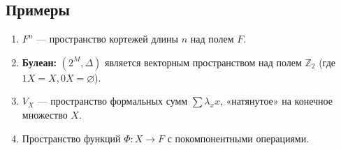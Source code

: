 \subsection*{Примеры}
\begin{enumerate}
    \item $F^n$ — пространство кортежей длины $n$ над полем $F$.
    \item \textbf{Булеан:} $(2^M, \Delta)$ является векторным пространством над полем $\mathbb{Z}_2$ (где $1X = X, 0X = \varnothing$).
    \item $V_X$ — пространство формальных сумм $\sum \lambda_x x$, «натянутое» на конечное множество $X$.
    \item Пространство функций $\Phi: X \to F$ с покомпонентными операциями.
\end{enumerate}